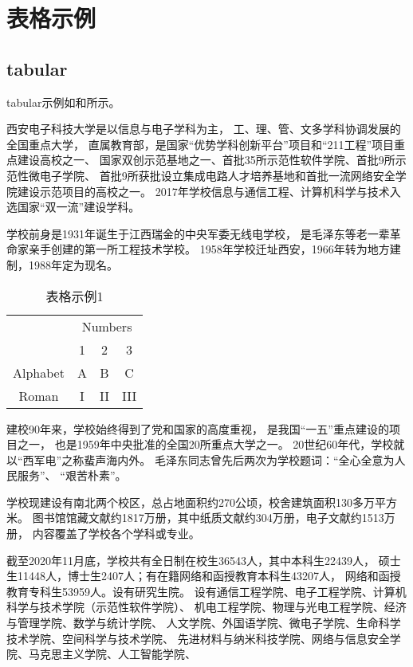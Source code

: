 \chapter{表格示例}
\section{tabular}
tabular示例如和所示。
\par
西安电子科技大学是以信息与电子学科为主，
工、理、管、文多学科协调发展的全国重点大学，
直属教育部，是国家“优势学科创新平台”项目和“211工程”项目重点建设高校之一、
国家双创示范基地之一、首批35所示范性软件学院、首批9所示范性微电子学院、
首批9所获批设立集成电路人才培养基地和首批一流网络安全学院建设示范项目的高校之一。
2017年学校信息与通信工程、计算机科学与技术入选国家“双一流”建设学科。
\par
学校前身是1931年诞生于江西瑞金的中央军委无线电学校，
是毛泽东等老一辈革命家亲手创建的第一所工程技术学校。
1958年学校迁址西安，1966年转为地方建制，1988年定为现名。
\begin{table}
\renewcommand{\arraystretch}{1.5}
\caption{表格示例1}
\label{tab1}
\centering
\begin{tabular}{cccc}
\toprule & \multicolumn{3}{c}{Numbers} \\
\cmidrule{2-4} & 1 & 2 & 3 \\
\midrule
Alphabet & A & B & C \\
Roman & I & II & III \\
\bottomrule
\end{tabular}
\end{table}
\par
建校90年来，学校始终得到了党和国家的高度重视，
是我国“一五”重点建设的项目之一，
也是1959年中央批准的全国20所重点大学之一。
20世纪60年代，学校就以“西军电”之称蜚声海内外。
毛泽东同志曾先后两次为学校题词：“全心全意为人民服务”、
“艰苦朴素”。
\par
学校现建设有南北两个校区，总占地面积约270公顷，校舍建筑面积130多万平方米。
图书馆馆藏文献约1817万册，其中纸质文献约304万册，电子文献约1513万册，
内容覆盖了学校各个学科或专业。
\par
截至2020年11月底，学校共有全日制在校生36543人，其中本科生22439人，
硕士生11448人，博士生2407人；有在籍网络和函授教育本科生43207人，
网络和函授教育专科生53959人。设有研究生院。
设有通信工程学院、电子工程学院、计算机科学与技术学院（示范性软件学院）、
机电工程学院、物理与光电工程学院、经济与管理学院、数学与统计学院、
人文学院、外国语学院、微电子学院、生命科学技术学院、空间科学与技术学院、
先进材料与纳米科技学院、网络与信息安全学院、马克思主义学院、人工智能学院、
